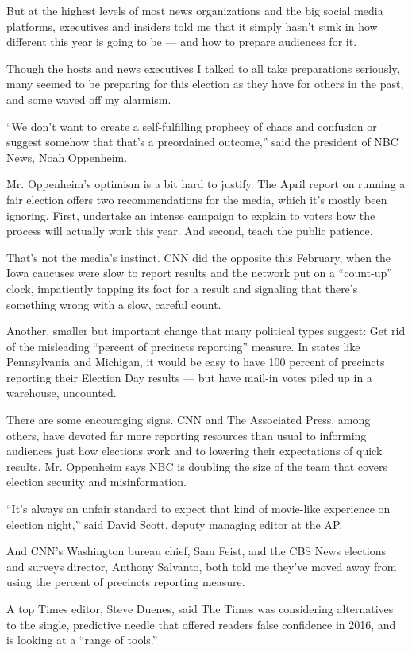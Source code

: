 But at the highest levels of most news organizations and the big social
media platforms, executives and insiders told me that it simply hasn't
sunk in how different this year is going to be --- and how to prepare
audiences for it.

Though the hosts and news executives I talked to all take preparations
seriously, many seemed to be preparing for this election as they have
for others in the past, and some waved off my alarmism.

``We don't want to create a self-fulfilling prophecy of chaos and
confusion or suggest somehow that that's a preordained outcome,'' said
the president of NBC News, Noah Oppenheim.

Mr. Oppenheim's optimism is a bit hard to justify. The April report on
running a fair election offers two recommendations for the media, which
it's mostly been ignoring. First, undertake an intense campaign to
explain to voters how the process will actually work this year. And
second, teach the public patience.

That's not the media's instinct. CNN did the opposite this February,
when the Iowa caucuses were slow to report results and the network put
on a ``count-up'' clock, impatiently tapping its foot for a result and
signaling that there's something wrong with a slow, careful count.

Another, smaller but important change that many political types suggest:
Get rid of the misleading ``percent of precincts reporting'' measure. In
states like Pennsylvania and Michigan, it would be easy to have 100
percent of precincts reporting their Election Day results --- but have
mail-in votes piled up in a warehouse, uncounted.

There are some encouraging signs. CNN and The Associated Press, among
others, have devoted far more reporting resources than usual to
informing audiences just how elections work and to lowering their
expectations of quick results. Mr. Oppenheim says NBC is doubling the
size of the team that covers election security and misinformation.

``It's always an unfair standard to expect that kind of movie-like
experience on election night,'' said David Scott, deputy managing editor
at the AP.

And CNN's Washington bureau chief, Sam Feist, and the CBS News elections
and surveys director, Anthony Salvanto, both told me they've moved away
from using the percent of precincts reporting measure.

A top Times editor, Steve Duenes, said The Times was considering
alternatives to the single, predictive needle that offered readers false
confidence in 2016, and is looking at a ``range of tools.''

